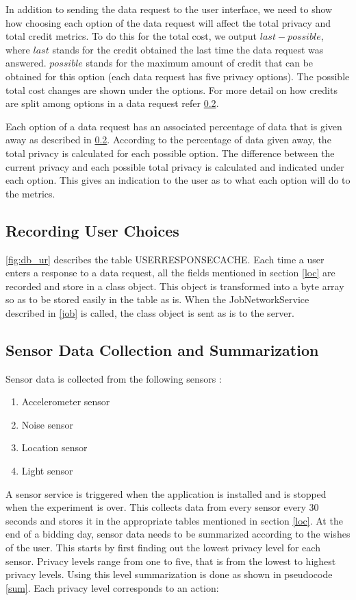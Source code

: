 In addition to sending the data request to the user interface, we need to show how choosing each option of the data request will affect the total privacy and total credit metrics. To do this for the total cost, we output $last-possible$, where $last$ stands for the credit obtained the last time the data request was answered. $possible$ stands for the maximum amount of credit that can be obtained for this option (each data request has five privacy options). The possible total cost changes are shown under the options. For more detail on how credits are split among options in a data request refer \ref{}.

Each option of a data request has an associated percentage of data that is given away as described in \ref{}. According to the percentage of data given away, the total privacy is calculated for each possible option. The difference between the current privacy and each possible total privacy is calculated and indicated under each option. This gives an indication to the user as to what each option will do to the metrics.

\subsection{Recording User Choices}

\ref{fig:db_ur} describes the table USERRESPONSECACHE. Each time a user enters a response to a data request, all the fields mentioned in section
\ref{loc} are recorded and store in a class object. This object is transformed into a byte array so as to be stored easily in the table as is.
When the JobNetworkService described in \ref{job} is called, the class object is sent as is to the server.


\subsection{Sensor Data Collection and Summarization} 

Sensor data is collected from the following sensors :

\begin{enumerate}
	\item Accelerometer sensor
	\item Noise sensor
    \item Location sensor
    \item Light sensor
\end{enumerate}

A sensor service is triggered when the application is installed and is stopped when the experiment is over. This collects data from every sensor
every 30 seconds and stores it in the appropriate tables mentioned in section \ref{loc}.
At the end of a bidding day, sensor data needs to be summarized according to the wishes of the user. This starts by first finding out the lowest privacy level for each sensor. Privacy levels range from one to five, that is from the lowest to highest privacy levels. Using this level
summarization is done as shown in pseudocode \ref{sum}. Each privacy level corresponds to an action:

